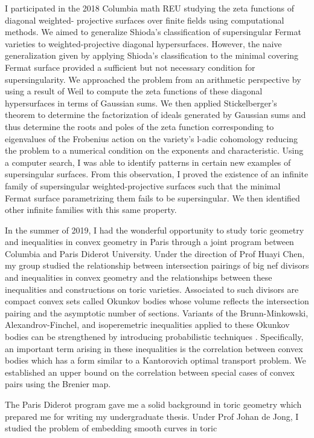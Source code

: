 \documentclass[11pt]{article}
\begin{document}
\par
I participated in the 2018 Columbia math REU studying the zeta functions of diagonal weighted-
projective surfaces over finite fields using computational methods. We aimed to generalize Shioda’s classification of supersingular Fermat varieties to weighted-projective diagonal hypersurfaces. However, the naive generalization given by applying Shioda’s classification to the minimal covering Fermat surface
provided a sufficient but not necessary condition for supersingularity. We approached the problem from an arithmetic perspective by using a result of Weil to compute the zeta functions of these diagonal hypersurfaces in terms of Gaussian sums. We then applied Stickelberger's theorem to determine the
factorization of ideals generated by Gaussian sums and thus determine the roots and poles of the zeta function corresponding to eigenvalues of the Frobenius action on the variety’s l-adic cohomology reducing the problem to a numerical condition on the exponents and characteristic. Using a computer search, I was able to identify patterns in certain new examples of supersingular surfaces. From this observation, I proved the existence of an infinite family of supersingular weighted-projective surfaces
such that the minimal Fermat surface parametrizing them fails to be supersingular. We then identified other infinite families with this same property.
\par 
In the summer of 2019, I had the wonderful opportunity to study toric geometry and inequalities in convex
geometry in Paris through a joint program between Columbia and Paris Diderot University. Under the
direction of Prof Huayi Chen, my group studied the relationship between intersection pairings of big nef divisors and inequalities in convex geometry and the relationships between these inequalities and
constructions on toric varieties. Associated to such divisors are compact convex sets called Okunkov
bodies whose volume reflects the intersection pairing and the asymptotic number of sections. Variants of the
Brunn-Minkowski, Alexandrov-Finchel, and isoperemetric inequalities applied to these Okunkov bodies
can be strengthened by introducing probabilistic techniques . Specifically, an important term arising in these inequalities is the correlation between convex bodies which has a form similar to a Kantorovich
optimal transport problem. We established an upper bound on the correlation between special cases of
convex pairs using the Brenier map.
\par
The Paris Diderot program gave me a solid background in toric geometry which prepared me for writing my undergraduate thesis. Under Prof Johan de Jong, I studied the problem of embedding smooth curves in toric
\end{document}

